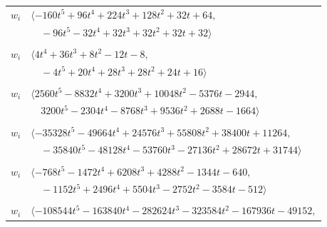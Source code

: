 \documentclass[11pt]{article}
\begin{document}
\begin{longtable}{@{}ll@{}}
$w_i$ & $\langle -160t^{5}+96t^{4}+224t^{3}+128t^{2}+32t+64,$\\
 & $\quad -96t^{5}-32t^{4}+32t^{3}+32t^{2}+32t+32\rangle$\\
\addlinespace[2pt]
\multicolumn{2}{@{}p{0.97\textwidth}@{}}{$i=6$, $D_i=4$, $\rho_{ij}$: $8{:}1, \allowbreak 12{:}1, \allowbreak 14{:}2, \allowbreak 17{:}2, \allowbreak 18{:}2, \allowbreak 26{:}2, \allowbreak 31{:}2, \allowbreak 35{:}1, \allowbreak 36{:}2, \allowbreak 41{:}1$}\\
$w_i$ & $\langle 4t^{4}+36t^{3}+8t^{2}-12t-8,$\\
 & $\quad -4t^{5}+20t^{4}+28t^{3}+28t^{2}+24t+16\rangle$\\
\addlinespace[2pt]
\multicolumn{2}{@{}p{0.97\textwidth}@{}}{$i=7$, $D_i=448$, $\rho_{ij}$: $4{:}1, \allowbreak 11{:}2, \allowbreak 13{:}1, \allowbreak 15{:}2, \allowbreak 21{:}2, \allowbreak 24{:}2, \allowbreak 28{:}2$}\\
$w_i$ & $\langle 2560t^{5}-8832t^{4}+3200t^{3}+10048t^{2}-5376t-2944,$\\
 & $\quad 3200t^{5}-2304t^{4}-8768t^{3}+9536t^{2}+2688t-1664\rangle$\\
\addlinespace[2pt]
\multicolumn{2}{@{}p{0.97\textwidth}@{}}{$i=8$, $D_i=512$, $\rho_{ij}$: $0{:}2, \allowbreak 3{:}2, \allowbreak 6{:}2, \allowbreak 17{:}2, \allowbreak 22{:}2, \allowbreak 26{:}2, \allowbreak 30{:}2, \allowbreak 41{:}2$}\\
$w_i$ & $\langle -35328t^{5}-49664t^{4}+24576t^{3}+55808t^{2}+38400t+11264,$\\
 & $\quad -35840t^{5}-48128t^{4}-53760t^{3}-27136t^{2}+28672t+31744\rangle$\\
\addlinespace[2pt]
\multicolumn{2}{@{}p{0.97\textwidth}@{}}{$i=9$, $D_i=448$, $\rho_{ij}$: $2{:}1, \allowbreak 10{:}2, \allowbreak 14{:}2, \allowbreak 16{:}1, \allowbreak 18{:}1, \allowbreak 23{:}1, \allowbreak 24{:}2, \allowbreak 37{:}1$}\\
$w_i$ & $\langle -768t^{5}-1472t^{4}+6208t^{3}+4288t^{2}-1344t-640,$\\
 & $\quad -1152t^{5}+2496t^{4}+5504t^{3}-2752t^{2}-3584t-512\rangle$\\
\addlinespace[2pt]
\multicolumn{2}{@{}p{0.97\textwidth}@{}}{$i=10$, $D_i=2048$, $\rho_{ij}$: $0{:}1, \allowbreak 1{:}2, \allowbreak 5{:}1, \allowbreak 9{:}1, \allowbreak 11{:}2, \allowbreak 13{:}1, \allowbreak 17{:}1, \allowbreak 19{:}2, \allowbreak 25{:}2, \allowbreak 26{:}2, \allowbreak 28{:}1, \allowbreak 36{:}1$}\\
$w_i$ & $\langle -108544t^{5}-163840t^{4}-282624t^{3}-323584t^{2}-167936t-49152,$\\

\end{longtable}
\end{document}
